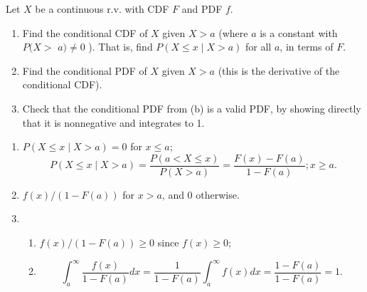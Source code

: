

\setcounter{theorem}{3}
\begin{exercise}[BH.5.4] Let $X$ be a continuous r.v. with  {CDF} $F$ and {PDF} $f$.
	\begin{enumerate}
		\item Find the conditional CDF of $X$ given $X>a$ (where $a$ is a constant with $P(X>$ $a) \neq 0$ ). That is, find $P(X \leq x \mid X>a)$ for all $a$, in terms of $F$.
		\item Find the conditional PDF of $X$ given $X>a$ (this is the derivative of the conditional CDF).
		\item  Check that the conditional PDF from (b) is a valid PDF, by showing directly that it is nonnegative and integrates to 1.
	\end{enumerate}  
\begin{solution}
    \begin{enumerate}
        \item  $P(X \leq x \mid X>a)=0$ for $x \leq a$;  
        $$
        P(X \leq x \mid X>a)=\frac{P(a<X \leq x)}{P(X>a)}=\frac{F(x)-F(a)}{1-F(a)}; x\geq a .
        $$
        \item  $f(x) /(1-F(a))$ for $x>a$, and 0 otherwise.
        \item 
        \begin{enumerate}
            \item $f(x) /(1-F(a)) \geq 0$ since $f(x) \geq 0$;
            \item 	$$
            \int_a^{\infty} \frac{f(x)}{1-F(a)} d x=\frac{1}{1-F(a)} \int_a^{\infty} f(x) d x=\frac{1-F(a)}{1-F(a)}=1 .
            $$
        \end{enumerate} 
    
    \end{enumerate}
\end{solution}
\end{exercise}


